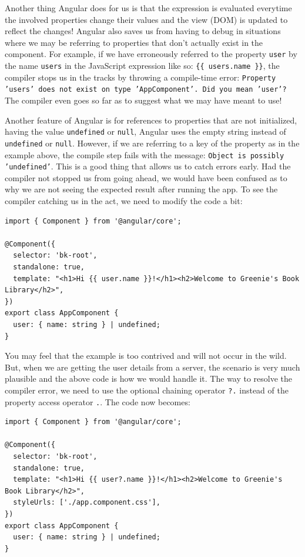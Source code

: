 \documentclass{report}
\begin{document}
Another thing Angular does for us is that the expression is evaluated everytime the involved properties change their values and the view (DOM) is updated to reflect the changes! Angular also saves us from having to debug in situations where we may be referring to properties that don't actually exist in the component. For example, if we have erroneously referred to the property \verb|user| by the name \verb|users| in the JavaScript expression like so: \verb|{{ users.name }}|, the compiler stops us in the tracks by throwing a compile-time error: \texttt{Property 'users' does not exist on type 'AppComponent'. Did you mean 'user'?} The compiler even goes so far as to suggest what we may have meant to use!

Another feature of Angular is for references to properties that are not initialized, having the value \verb|undefined| or \verb|null|, Angular uses the empty string instead of \verb|undefined| or \verb|null|. However, if we are referring to a key of the property as in the example above, the compile step fails with the message: \texttt{Object is possibly 'undefined'}. This is a good thing that allows us to catch errors early. Had the compiler not stopped us from going ahead, we would have been confused as to why we are not seeing the expected result after running the app. To see the compiler catching us in the act, we need to modify the code a bit:

\begin{Verbatim}[label=v2.1.1a]
import { Component } from '@angular/core';

@Component({
  selector: 'bk-root',
  standalone: true,
  template: "<h1>Hi {{ user.name }}!</h1><h2>Welcome to Greenie's Book Library</h2>",
})
export class AppComponent {
  user: { name: string } | undefined;
}
\end{Verbatim}

You may feel that the example is too contrived and will not occur in the wild. But, when we are getting the user details from a server, the scenario is very much plausible and the above code is how we would handle it. The way to resolve the compiler error, we need to use the optional chaining operator \verb|?.| instead of the property access operator \verb|.|. The code now becomes:

\begin{Verbatim}[label=v2.1.2]
import { Component } from '@angular/core';

@Component({
  selector: 'bk-root',
  standalone: true,
  template: "<h1>Hi {{ user?.name }}!</h1><h2>Welcome to Greenie's Book Library</h2>",
  styleUrls: ['./app.component.css'],
})
export class AppComponent {
  user: { name: string } | undefined;
}
\end{Verbatim}
\end{document}
